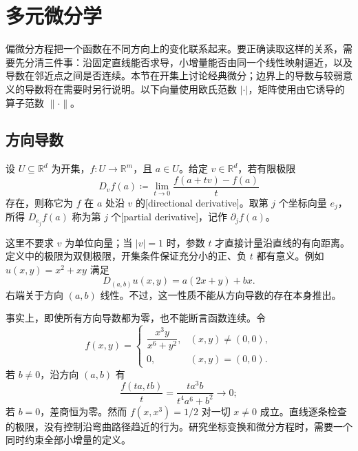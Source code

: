 \section{多元微分学}
\label{b2:sec:0101}


偏微分方程把一个函数在不同方向上的变化联系起来。要正确读取这样的关系，需要先分清三件事：沿固定直线能否求导，小增量能否由同一个线性映射逼近，以及导数在邻近点之间是否连续。本节在开集上讨论经典微分；边界上的导数与较弱意义的导数将在需要时另行说明。以下向量使用欧氏范数 \(\lvert\cdot\rvert\)，矩阵使用由它诱导的算子范数 \(\lVert\cdot\rVert\)。

\subsection{方向导数}
\label{b2:subsec:010101}

\begin{definition}\label{b2:def:01-directional}
设 \(U\subseteq\mathbb R^d\) 为开集，\(f:U\rightarrow\mathbb R^m\)，且 \(a\in U\)。给定 \(v\in\mathbb R^d\)，若有限极限
\[
 D_vf(a)\coloneqq\lim_{t\to0}\frac{f(a+tv)-f(a)}{t}
\]
存在，则称它为 \(f\) 在 \(a\) 处沿 \(v\) 的[directional derivative]。取第 \(j\) 个坐标向量 \(e_j\)，所得 \(D_{e_j}f(a)\) 称为第 \(j\) 个[partial derivative]，记作 \(\partial_jf(a)\)。
\end{definition}

这里不要求 \(v\) 为单位向量；当 \(\lvert v\rvert=1\) 时，参数 \(t\) 才直接计量沿直线的有向距离。定义中的极限为双侧极限，开集条件保证充分小的正、负 \(t\) 都有意义。例如 \(u(x,y)=x^2+xy\) 满足
\[
 D_{(a,b)}u(x,y)=a(2x+y)+bx.
\]
右端关于方向 \((a,b)\) 线性。不过，这一性质不能从方向导数的存在本身推出。

\ProseParagraphBreak

事实上，即使所有方向导数都为零，也不能断言函数连续。令
\[
 f(x,y)=
 \begin{cases}
 \dfrac{x^3y}{x^6+y^2},&(x,y)\ne(0,0),\\[4pt]
 0,&(x,y)=(0,0).
 \end{cases}
\]
若 \(b\ne0\)，沿方向 \((a,b)\) 有
\[
 \frac{f(ta,tb)}t=\frac{ta^3b}{t^4a^6+b^2}\longrightarrow0;
\]
若 \(b=0\)，差商恒为零。然而 \(f(x,x^3)=1/2\) 对一切 \(x\ne0\) 成立。直线逐条检查的极限，没有控制沿弯曲路径趋近的行为。研究坐标变换和微分方程时，需要一个同时约束全部小增量的定义。

